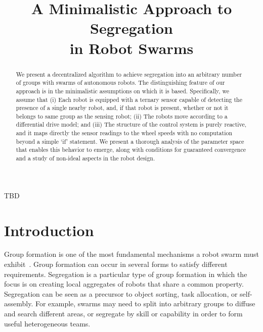 \documentclass[conference]{IEEEtran}
\begin{document}
\title{A Minimalistic Approach to Segregation\\
  in Robot Swarms}

\author{
}

\maketitle

\begin{abstract}
  We present a decentralized algorithm to achieve segregation into an arbitrary
  number of groups with swarms of autonomous robots. The distinguishing feature
  of our approach is in the minimalistic assumptions on which it is
  based. Specifically, we assume that (i) Each robot is equipped with a ternary
  sensor capable of detecting the presence of a single nearby robot, and, if
  that robot is present, whether or not it belongs to same group as the sensing
  robot; (ii) The robots move according to a differential drive model; and (iii)
  The structure of the control system is purely reactive, and it maps directly
  the sensor readings to the wheel speeds with no computation beyond a simple
  `if' statement. We present a thorough analysis of the parameter space that
  enables this behavior to emerge, along with conditions for guaranteed
  convergence and a study of non-ideal aspects in the robot design.
\end{abstract}

\begin{IEEEkeywords}
  TBD
\end{IEEEkeywords}

\section{Introduction}

Group formation is one of the most fundamental mechanisms a robot swarm must
exhibit~\cite{Brambilla2013}. Group formation can occur in several forms to
satisfy different requirements. Segregation is a particular type of group
formation in which the focus is on creating local aggregates of robots that
share a common property. Segregation can be seen as a precursor to object
sorting, task allocation, or self-assembly. For example, swarms may need to
split into arbitrary groups to diffuse and search different areas, or segregate
by skill or capability in order to form useful heterogeneous teams.
\end{document}
